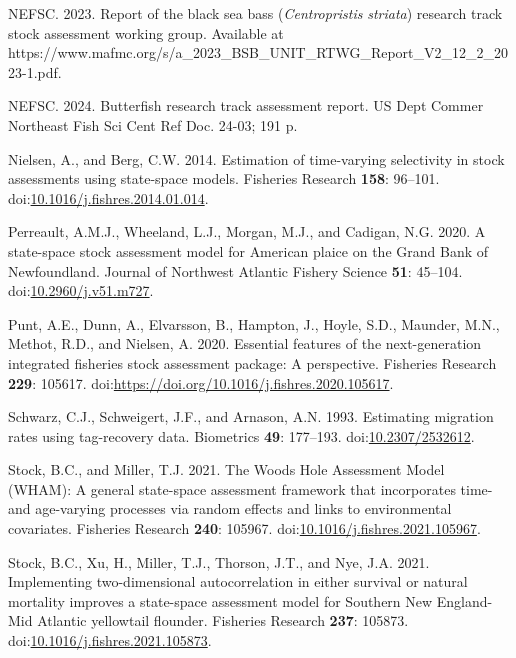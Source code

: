 \documentclass[
]{article}
\newlength{\cslhangindent}
\newlength{\cslentryspacingunit} %
\newenvironment{CSLReferences}[2] %
 {%
  \setlength{\parindent}{0pt}
  \ifodd #1
  \let\oldpar\par
  \def\par{\hangindent=\cslhangindent\oldpar}
  \fi
  \setlength{\parskip}{#2\cslentryspacingunit}
 }%
 {}
\begin{document}
\begin{CSLReferences}{1}{0}
\leavevmode{}%
NEFSC. 2023. Report of the black sea bass (\emph{{C}entropristis}
\emph{striata}) research track stock assessment working group.
{Available} at
https://www.mafmc.org/s/a\_2023\_BSB\_UNIT\_RTWG\_Report\_V2\_12\_2\_2023-1.pdf.

\leavevmode{}%
NEFSC. 2024. Butterfish research track assessment report. US Dept Commer
Northeast Fish Sci Cent Ref Doc. 24-03; 191 p.

\leavevmode{}%
Nielsen, A., and Berg, C.W. 2014. Estimation of time-varying selectivity
in stock assessments using state-space models. Fisheries Research
\textbf{158}: 96--101.
doi:\href{https://doi.org/10.1016/j.fishres.2014.01.014}{10.1016/j.fishres.2014.01.014}.

\leavevmode{}%
Perreault, A.M.J., Wheeland, L.J., Morgan, M.J., and Cadigan, N.G. 2020.
A state-space stock assessment model for {American} plaice on the
{Grand} {Bank} of {Newfoundland}. Journal of Northwest Atlantic Fishery
Science \textbf{51}: 45--104.
doi:\href{https://doi.org/10.2960/j.v51.m727}{10.2960/j.v51.m727}.

\leavevmode{}%
Punt, A.E., Dunn, A., Elvarsson, B., Hampton, J., Hoyle, S.D., Maunder,
M.N., Methot, R.D., and Nielsen, A. 2020. Essential features of the
next-generation integrated fisheries stock assessment package: A
perspective. Fisheries Research \textbf{229}: 105617.
doi:\url{https://doi.org/10.1016/j.fishres.2020.105617}.

\leavevmode{}%
Schwarz, C.J., Schweigert, J.F., and Arnason, A.N. 1993. Estimating
migration rates using tag-recovery data. Biometrics \textbf{49}:
177--193. doi:\href{https://doi.org/10.2307/2532612}{10.2307/2532612}.

\leavevmode{}%
Stock, B.C., and Miller, T.J. 2021. The {Woods Hole Assessment Model}
({WHAM}): A general state-space assessment framework that incorporates
time- and age-varying processes via random effects and links to
environmental covariates. Fisheries Research \textbf{240}: 105967.
doi:\href{https://doi.org/10.1016/j.fishres.2021.105967}{10.1016/j.fishres.2021.105967}.

\leavevmode{}%
Stock, B.C., Xu, H., Miller, T.J., Thorson, J.T., and Nye, J.A. 2021.
Implementing two-dimensional autocorrelation in either survival or
natural mortality improves a state-space assessment model for {Southern
New England}-{Mid Atlantic} yellowtail flounder. Fisheries Research
\textbf{237}: 105873.
doi:\href{https://doi.org/10.1016/j.fishres.2021.105873}{10.1016/j.fishres.2021.105873}.


\end{CSLReferences}
\end{document}
